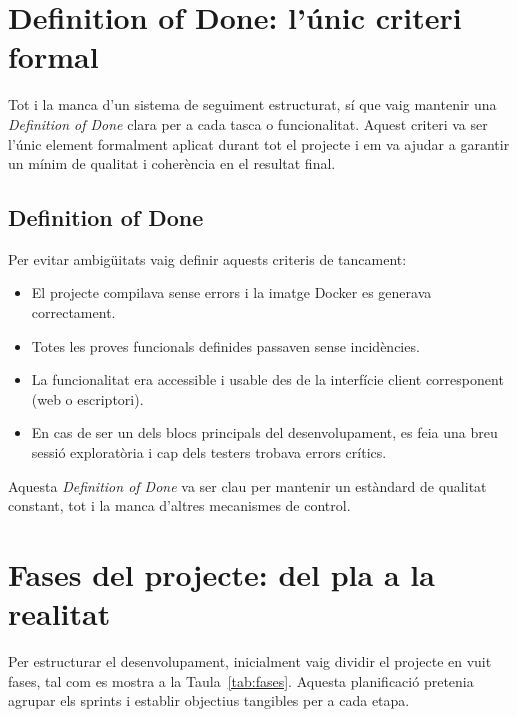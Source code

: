 \section{Definition of Done: l'únic criteri formal}

Tot i la manca d'un sistema de seguiment estructurat, sí que vaig mantenir una \emph{Definition of Done} clara per a cada tasca o funcionalitat. Aquest criteri va ser l'únic element formalment aplicat durant tot el projecte i em va ajudar a garantir un mínim de qualitat i coherència en el resultat final.

\subsection*{Definition of Done}
Per evitar ambigüitats vaig definir aquests criteris de tancament:
\begin{itemize}
  \item El projecte compilava sense errors i la imatge Docker es generava correctament.
  \item Totes les proves funcionals definides passaven sense incidències.
  \item La funcionalitat era accessible i usable des de la interfície client corresponent (web o escriptori).
  \item En cas de ser un dels blocs principals del desenvolupament, es feia una breu sessió exploratòria i cap dels testers trobava errors crítics.
\end{itemize}
Aquesta \emph{Definition of Done} va ser clau per mantenir un estàndard de qualitat constant, tot i la manca d'altres mecanismes de control.

\section{Fases del projecte: del pla a la realitat}

Per estructurar el desenvolupament, inicialment vaig dividir el projecte en vuit fases, tal com es mostra a la Taula~\ref{tab:fases}. Aquesta planificació pretenia agrupar els sprints i establir objectius tangibles per a cada etapa.

